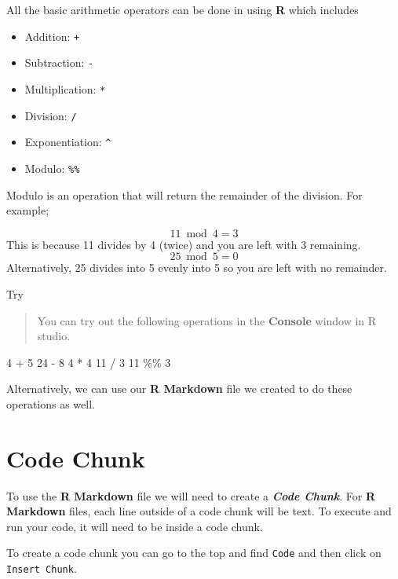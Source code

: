 \documentclass[
]{book}
\newenvironment{Shaded}{\begin{snugshade}}{\end{snugshade}}
\newcommand{\DecValTok}[1]{\textcolor[rgb]{0.00,0.00,0.81}{#1}}
\newcommand{\SpecialCharTok}[1]{\textcolor[rgb]{0.00,0.00,0.00}{#1}}
\providecommand{\tightlist}{%
  \setlength{\itemsep}{0pt}\setlength{\parskip}{0pt}}
\begin{document}
All the basic arithmetic operators can be done in using \textbf{R} which includes

\begin{itemize}
\tightlist
\item
  Addition: \texttt{+}
\item
  Subtraction: \texttt{-}
\item
  Multiplication: \texttt{*}
\item
  Division: \texttt{/}
\item
  Exponentiation: \texttt{\^{}}
\item
  Modulo: \texttt{\%\%}
\end{itemize}

Modulo is an operation that will return the remainder of the division. For example;

\[
11 \bmod 4 = 3
\]
This is because 11 divides by 4 (twice) and you are left with 3 remaining.
\[
25 \bmod 5 = 0
\]
Alternatively, 25 divides into 5 evenly into 5 so you are left with no remainder.

Try

\begin{quote}
You can try out the following operations in the \textbf{Console} window in R studio.
\end{quote}

\begin{Shaded}
\begin{Highlighting}[]
\DecValTok{4} \SpecialCharTok{+} \DecValTok{5}
\DecValTok{24} \SpecialCharTok{{-}} \DecValTok{8}
\DecValTok{4} \SpecialCharTok{*} \DecValTok{4}
\DecValTok{11} \SpecialCharTok{/} \DecValTok{3}
\DecValTok{11} \SpecialCharTok{\%\%} \DecValTok{3}
\end{Highlighting}
\end{Shaded}

Alternatively, we can use our \textbf{R Markdown} file we created to do these operations as well.

\hypertarget{code-chunk}{%
\section{Code Chunk}\label{code-chunk}}

To use the \textbf{R Markdown} file we will need to create a \textbf{\emph{Code Chunk}}. For \textbf{R Markdown} files, each line outside of a code chunk will be text. To execute and run your code, it will need to be inside a code chunk.

To create a code chunk you can go to the top and find \texttt{Code} and then click on \texttt{Insert\ Chunk}.
\end{document}
